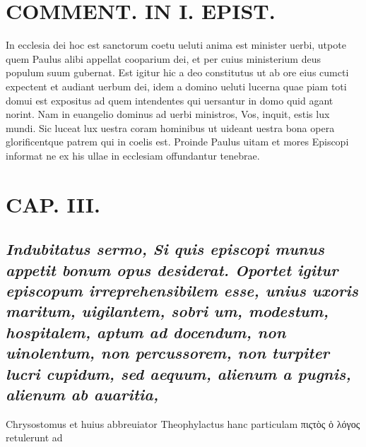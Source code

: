 \documentclass{article}
\begin{document}
\begin{pages}
\section*{COMMENT. IN I. EPIST. }\pstart In ecclesia dei hoc est sanctorum coetu ueluti anima est minister uerbi, utpote quem Paulus alibi appellat cooparium dei, et per cuius ministerium deus populum suum gubernat. Est igitur hic a deo constitutus ut ab ore eius cumcti expectent et audiant uerbum dei, idem a domino ueluti lucerna quae piam toti domui est expositus ad quem intendentes qui uersantur in domo quid agant norint. Nam in euangelio dominus ad uerbi ministros, Vos, inquit, estis lux mundi. Sic luceat lux uestra coram hominibus ut uideant uestra bona opera glorificentque patrem qui in coelis est. Proinde Paulus uitam et mores Episcopi informat ne ex his ullae in ecclesiam offundantur tenebrae.  \pend
\endnumbering\beginnumbering\section{CAP. III.}
{}
\subsection*{\textit{Indubitatus sermo, Si quis episcopi munus appetit bonum opus desiderat. Oportet igitur episcopum irreprehensibilem esse, unius uxoris maritum, uigilantem, sobri um, modestum, hospitalem, aptum ad docendum, non uinolentum, non percussorem, non turpiter lucri cupidum, sed aequum, alienum a pugnis, alienum ab auaritia, }}\pstart Chrysostomus et huius abbreuiator Theophylactus hanc particulam πιςτὸς ὁ λόγος retulerunt ad  \pend

\end{pages}
\end{document}
